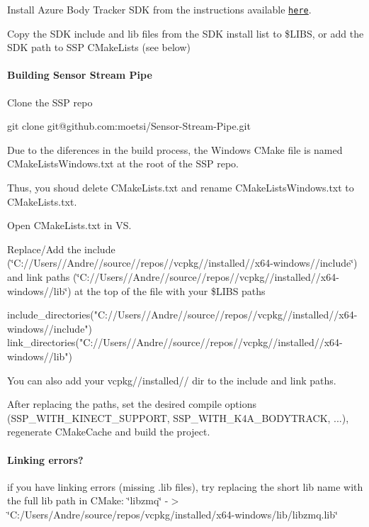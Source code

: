 Install Azure Body Tracker S\+DK from the instructions available \href{https://www.microsoft.com/en-us/download/details.aspx?id=100942}{\tt here}.

Copy the S\+DK include and lib files from the S\+DK install list to {\ttfamily \$\+L\+I\+BS}, or add the S\+DK path to S\+SP C\+Make\+Lists (see below)

\paragraph*{Building Sensor Stream Pipe}

Clone the S\+SP repo


\begin{DoxyCode}
git clone git@github.com:moetsi/Sensor-Stream-Pipe.git
\end{DoxyCode}


Due to the diferences in the build process, the Windows C\+Make file is named C\+Make\+Lists\+Windows.\+txt at the root of the S\+SP repo.

Thus, you shoud delete C\+Make\+Lists.\+txt and rename C\+Make\+Lists\+Windows.\+txt to C\+Make\+Lists.\+txt.

Open C\+Make\+Lists.\+txt in VS.

Replace/\+Add the include (\char`\"{}\+C\+://\+Users//\+Andre//source//repos//vcpkg//installed//x64-\/windows//include\char`\"{}) and link paths (\char`\"{}\+C\+://\+Users//\+Andre//source//repos//vcpkg//installed//x64-\/windows//lib\char`\"{}) at the top of the file with your {\ttfamily \$\+L\+I\+BS} paths


\begin{DoxyCode}
include\_directories("C://Users//Andre//source//repos//vcpkg//installed//x64-windows//include")
link\_directories("C://Users//Andre//source//repos//vcpkg//installed//x64-windows//lib")
\end{DoxyCode}


You can also add your {\ttfamily vcpkg//installed//} dir to the include and link paths.

After replacing the paths, set the desired compile options (S\+S\+P\+\_\+\+W\+I\+T\+H\+\_\+\+K\+I\+N\+E\+C\+T\+\_\+\+S\+U\+P\+P\+O\+RT, S\+S\+P\+\_\+\+W\+I\+T\+H\+\_\+\+K4\+A\+\_\+\+B\+O\+D\+Y\+T\+R\+A\+CK, ...), regenerate C\+Make\+Cache and build the project.

\paragraph*{Linking errors?}

if you have linking errors (missing .lib files), try replacing the short lib name with the full lib path in C\+Make\+: \char`\"{}libzmq\char`\"{} -\/$>$ \char`\"{}\+C\+:/\+Users/\+Andre/source/repos/vcpkg/installed/x64-\/windows/lib/libzmq.\+lib\char`\"{} 